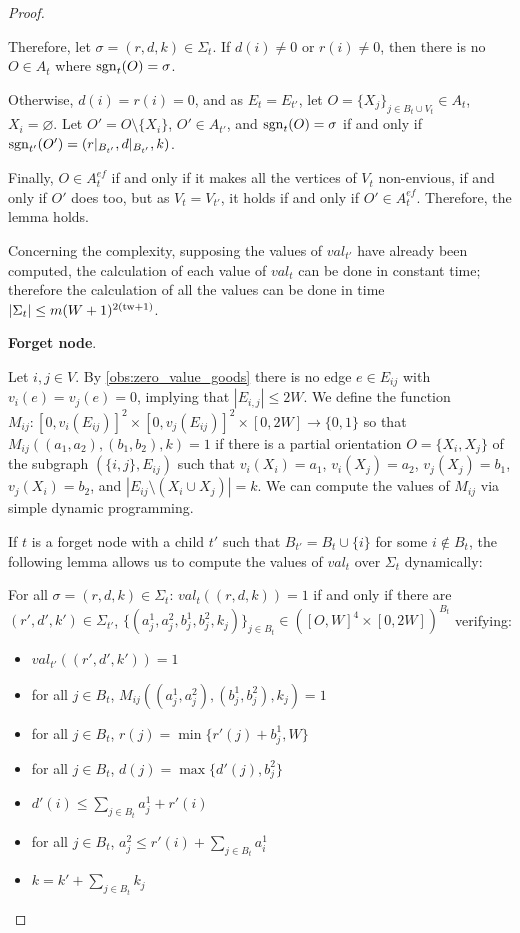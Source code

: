 \begin{proof}
\begin{nestedproof}
    Therefore, let $\sigma=(r,d,k)\in \Sigma_t$. If $d(i)\neq 0$ or $r(i)\neq 0$, then there is no $O\in A_t$ where $\operatorname{sgn}_t(O)=\sigma$.

    Otherwise, $d(i)=r(i)=0$, and as $E_t=E_{t'}$, let $O=\{X_j\}_{j\in B_t\cup V_t}\in A_t$, $X_i=\varnothing$. Let $O'=O\setminus\{X_i\}$, $O'\in A_{t'}$, and $\operatorname{sgn}_t(O)=\sigma$ if and only if $\operatorname{sgn}_{t'}(O')=(r|_{B_{t'}},d|_{B_{t'}},k)$.

    Finally, $O\in A_t^{ef}$ if and only if it makes all the vertices of $V_t$ non-envious, if and only if $O'$ does too, but as $V_t=V_{t'}$, it holds if and only if $O'\in A_t^{ef}$. Therefore, the lemma holds.
    \end{nestedproof}

    Concerning the complexity, supposing the values of $val_{t'}$ have already been computed, the calculation of each value of $val_t$ can be done in constant time; therefore the calculation of all the values can be done in time $|\Sigma_t|\leq m(W+1)^{2(\mathrm{tw} +1)}$.
    \medskip

    \textbf{Forget node}.

    Let $i,j \in V$.
    By \cref{obs:zero_value_goods} there is no edge $e \in E_{ij}$ with $v_i(e)=v_j(e)=0$,
    implying that $|E_{i,j}| \leq 2W$.
    We define the function $M_{ij} \colon [ 0,v_i(E_{ij})]^2 \times [0,v_j(E_{ij})]^2\times[0,2W] \to \{0,1\}$
    so that $M_{ij}((a_1,a_2),(b_1,b_2),k)=1$ if there is a partial orientation $O=\{X_i,X_j\}$ of the subgraph $(\{i,j\},E_{ij})$ such that $v_i(X_i)=a_1$, $v_i(X_j)=a_2$, $v_j(X_j)=b_1$, $v_j(X_i)=b_2$, and $|E_{ij}\setminus(X_i\cup X_j)|=k$. We can compute the values of $M_{ij}$ via simple dynamic programming. %


    If $t$ is a forget node with a child $t'$ such that $B_{t'}=B_t\cup \{i\}$ for some $i\notin B_t$, the following lemma allows us to compute the values of $val_t$ over $\Sigma_t$ dynamically:

    \begin{lemma}

    For all $\sigma=(r,d,k)\in\Sigma_t$:
    $val_t((r,d,k))=1$ if and only if there are $(r',d',k')\in \Sigma_{t'}$, $\{(a_j^1,a_j^2,b_j^1,b_j^2,k_j)\}_{j\in B_t}\in ([O,W]^4\times[0,2W])^{B_t}$  verifying:  \begin{itemize}
        \item $val_{t'}((r',d',k'))=1$
        \item for all $j\in B_t$, $M_{ij}((a_j^1,a_j^2),(b_j^1,b_j^2),k_j)=1$
        \item for all $j\in B_t$, $r(j)=\min\{r'(j)+b_j^1,W\}$
        \item for all $j\in B_t$, $d(j)=\max\{d'(j),b_j^2\}$
        \item $d'(i)\leq\sum_{j\in B_t}a_j^1+r'(i)$
        \item for all $j\in B_t$, $a_j^2\leq r'(i)+\sum_{j\in B_t}a_i^1$
        \item $k=k'+\sum_{j\in B_t}k_j$
    \end{itemize}


\end{lemma}
\end{proof}
